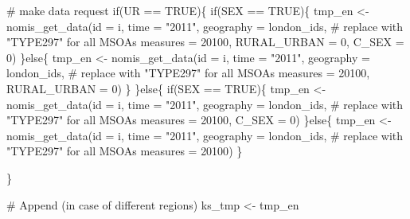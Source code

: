 \documentclass[
  letterpaper,
  DIV=11,
  numbers=noendperiod]{scrreprt}
\newenvironment{Shaded}{\begin{snugshade}}{\end{snugshade}}
\newcommand{\AttributeTok}[1]{\textcolor[rgb]{0.40,0.45,0.13}{#1}}
\newcommand{\CommentTok}[1]{\textcolor[rgb]{0.37,0.37,0.37}{#1}}
\newcommand{\ConstantTok}[1]{\textcolor[rgb]{0.56,0.35,0.01}{#1}}
\newcommand{\ControlFlowTok}[1]{\textcolor[rgb]{0.00,0.23,0.31}{#1}}
\newcommand{\DecValTok}[1]{\textcolor[rgb]{0.68,0.00,0.00}{#1}}
\newcommand{\FunctionTok}[1]{\textcolor[rgb]{0.28,0.35,0.67}{#1}}
\newcommand{\NormalTok}[1]{\textcolor[rgb]{0.00,0.23,0.31}{#1}}
\newcommand{\OtherTok}[1]{\textcolor[rgb]{0.00,0.23,0.31}{#1}}
\newcommand{\SpecialCharTok}[1]{\textcolor[rgb]{0.37,0.37,0.37}{#1}}
\newcommand{\StringTok}[1]{\textcolor[rgb]{0.13,0.47,0.30}{#1}}
\begin{document}
\begin{Shaded}
\begin{Highlighting}[]
  \CommentTok{\# make data request}
  \ControlFlowTok{if}\NormalTok{(UR }\SpecialCharTok{==} \ConstantTok{TRUE}\NormalTok{)\{}
    \ControlFlowTok{if}\NormalTok{(SEX }\SpecialCharTok{==} \ConstantTok{TRUE}\NormalTok{)\{}
\NormalTok{      tmp\_en }\OtherTok{\textless{}{-}} \FunctionTok{nomis\_get\_data}\NormalTok{(}\AttributeTok{id =}\NormalTok{ i, }\AttributeTok{time =} \StringTok{"2011"}\NormalTok{,}
                               \AttributeTok{geography =}\NormalTok{ london\_ids, }\CommentTok{\# replace with "TYPE297" for all MSOAs}
                               \AttributeTok{measures =} \DecValTok{20100}\NormalTok{, }\AttributeTok{RURAL\_URBAN =} \DecValTok{0}\NormalTok{, }\AttributeTok{C\_SEX =} \DecValTok{0}\NormalTok{)}
\NormalTok{    \}}\ControlFlowTok{else}\NormalTok{\{}
\NormalTok{      tmp\_en }\OtherTok{\textless{}{-}} \FunctionTok{nomis\_get\_data}\NormalTok{(}\AttributeTok{id =}\NormalTok{ i, }\AttributeTok{time =} \StringTok{"2011"}\NormalTok{,}
                               \AttributeTok{geography =}\NormalTok{ london\_ids, }\CommentTok{\# replace with "TYPE297" for all MSOAs}
                               \AttributeTok{measures =} \DecValTok{20100}\NormalTok{, }\AttributeTok{RURAL\_URBAN =} \DecValTok{0}\NormalTok{)}
\NormalTok{    \}}
\NormalTok{  \}}\ControlFlowTok{else}\NormalTok{\{}
    \ControlFlowTok{if}\NormalTok{(SEX }\SpecialCharTok{==} \ConstantTok{TRUE}\NormalTok{)\{}
\NormalTok{      tmp\_en }\OtherTok{\textless{}{-}} \FunctionTok{nomis\_get\_data}\NormalTok{(}\AttributeTok{id =}\NormalTok{ i, }\AttributeTok{time =} \StringTok{"2011"}\NormalTok{,}
                               \AttributeTok{geography =}\NormalTok{ london\_ids, }\CommentTok{\# replace with "TYPE297" for all MSOAs}
                               \AttributeTok{measures =} \DecValTok{20100}\NormalTok{, }\AttributeTok{C\_SEX =} \DecValTok{0}\NormalTok{)}
\NormalTok{    \}}\ControlFlowTok{else}\NormalTok{\{}
\NormalTok{      tmp\_en }\OtherTok{\textless{}{-}} \FunctionTok{nomis\_get\_data}\NormalTok{(}\AttributeTok{id =}\NormalTok{ i, }\AttributeTok{time =} \StringTok{"2011"}\NormalTok{,}
                               \AttributeTok{geography =}\NormalTok{ london\_ids, }\CommentTok{\# replace with "TYPE297" for all MSOAs}
                               \AttributeTok{measures =} \DecValTok{20100}\NormalTok{)}
\NormalTok{    \}}

\NormalTok{  \}}

  \CommentTok{\# Append (in case of different regions)}
\NormalTok{  ks\_tmp }\OtherTok{\textless{}{-}}\NormalTok{ tmp\_en}


\end{Highlighting}
\end{Shaded}
\end{document}
